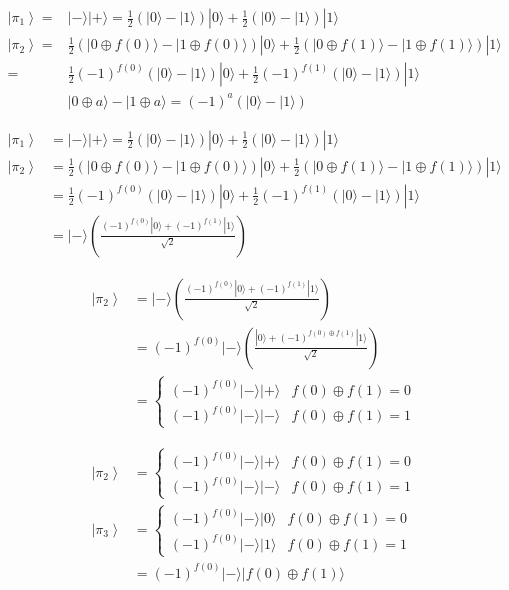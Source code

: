 \documentclass{book}
\begin{document}
\newpage
$$
\begin{aligned}
	\left|\pi_1\right\rangle= & |-\rangle|+\rangle=\frac{1}{2}(|0\rangle-|1\rangle)|0\rangle+\frac{1}{2}(|0\rangle-|1\rangle)|1\rangle \\
	\left|\pi_2\right\rangle= & \frac{1}{2}(|0 \oplus f(0)\rangle-|1 \oplus f(0)\rangle)|0\rangle+\frac{1}{2}(|0 \oplus f(1)\rangle-|1 \oplus f(1)\rangle)|1\rangle \\
	= & \frac{1}{2}(-1)^{f(0)}(|0\rangle-|1\rangle)|0\rangle+\frac{1}{2}(-1)^{f(1)}(|0\rangle-|1\rangle)|1\rangle \\
	& |0 \oplus a\rangle-|1 \oplus a\rangle=(-1)^a(|0\rangle-|1\rangle)
\end{aligned}
$$

$$
\begin{aligned}
	\left|\pi_1\right\rangle & =|-\rangle|+\rangle=\frac{1}{2}(|0\rangle-|1\rangle)|0\rangle+\frac{1}{2}(|0\rangle-|1\rangle)|1\rangle \\
	\left|\pi_2\right\rangle & =\frac{1}{2}(|0 \oplus f(0)\rangle-|1 \oplus f(0)\rangle)|0\rangle+\frac{1}{2}(|0 \oplus f(1)\rangle-|1 \oplus f(1)\rangle)|1\rangle \\
	& =\frac{1}{2}(-1)^{f(0)}(|0\rangle-|1\rangle)|0\rangle+\frac{1}{2}(-1)^{f(1)}(|0\rangle-|1\rangle)|1\rangle \\
	& =|-\rangle\left(\frac{(-1)^{f(0)}|0\rangle+(-1)^{f(1)}|1\rangle}{\sqrt{2}}\right)
\end{aligned}
$$

$$
\begin{aligned}
	\left|\pi_2\right\rangle & =|-\rangle\left(\frac{(-1)^{f(0)}|0\rangle+(-1)^{f(1)}|1\rangle}{\sqrt{2}}\right) \\
	& =(-1)^{f(0)}|-\rangle\left(\frac{|0\rangle+(-1)^{f(0) \oplus f(1)}|1\rangle}{\sqrt{2}}\right) \\
	& = \begin{cases}(-1)^{f(0)}|-\rangle|+\rangle & f(0) \oplus f(1)=0 \\
		(-1)^{f(0)}|-\rangle|-\rangle & f(0) \oplus f(1)=1\end{cases}
\end{aligned}
$$


$$
\begin{aligned}
	\left|\pi_2\right\rangle & = \begin{cases}(-1)^{f(0)}|-\rangle|+\rangle & f(0) \oplus f(1)=0 \\
		(-1)^{f(0)}|-\rangle|-\rangle & f(0) \oplus f(1)=1\end{cases} \\
	\left|\pi_3\right\rangle & = \begin{cases}(-1)^{f(0)}|-\rangle|0\rangle & f(0) \oplus f(1)=0 \\
		(-1)^{f(0)}|-\rangle|1\rangle & f(0) \oplus f(1)=1\end{cases} \\
	& =(-1)^{f(0)}|-\rangle|f(0) \oplus f(1)\rangle
\end{aligned}
$$
\end{document}
